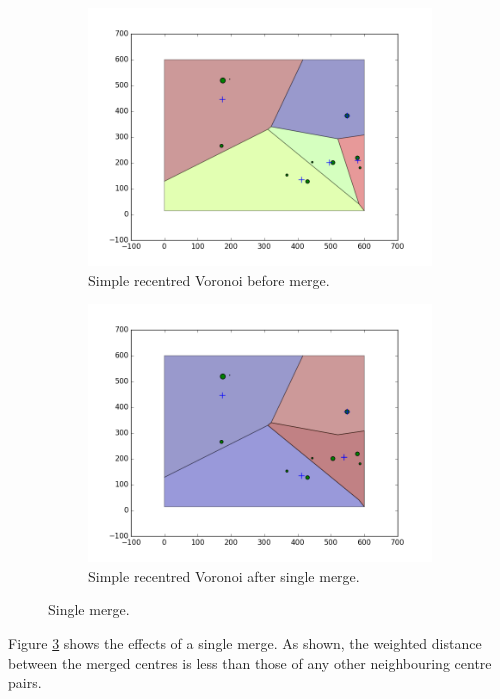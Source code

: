 \begin{figure}[H]
\begin{subfigure}[b]{0.5\textwidth}
  \includegraphics[width=\textwidth]{Images/1merge1.png}
  \caption{Simple recentred Voronoi before merge.}
  \label{fig:1merge1}
\end{subfigure}
\hfill
\begin{subfigure}[b]{0.5\textwidth}
  \includegraphics[width=\textwidth]{Images/1merge2.png}
  \caption{Simple recentred Voronoi after single merge.}
  \label{fig:1merge2}
\end{subfigure}
\caption{Single merge.}
\label{fig:1merge}
\end{figure}
Figure \ref{fig:1merge} shows the effects of a single merge. As shown, the weighted distance between the merged centres is less than those of any other neighbouring centre pairs.
